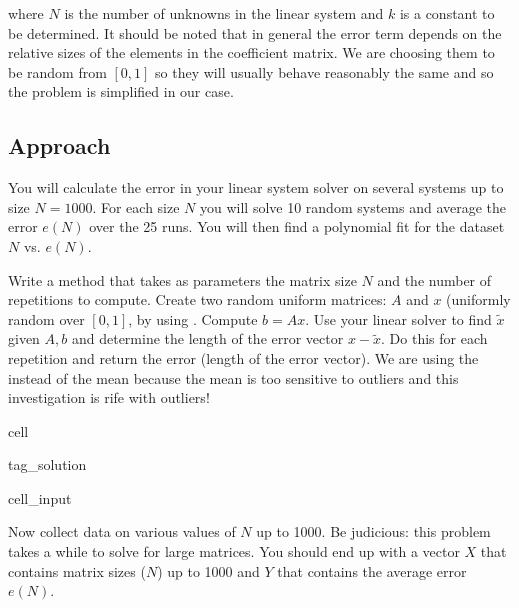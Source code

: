 \documentclass[letterpaper,10pt,english]{jupyterBook}
\begin{document}
\sphinxAtStartPar
where \(N\) is the number of unknowns in the linear system and \(k\) is a constant to be determined. It should be noted that in general the error term depends on the relative sizes of the elements in the coefficient matrix. We are choosing them to be random from \([0,1]\) so they will usually behave reasonably the same and so the problem is simplified in our case.


\subsection{Approach}
\label{\detokenize{lessons/Gaussian_Elimination-student:approach}}
\sphinxAtStartPar
You will calculate the error in your linear system solver on several systems up to size \(N=1000\). For each size \(N\) you will solve 10 random systems and average the error \(e(N)\) over the 25 runs. You will then find a polynomial fit for the dataset \(N\) vs. \(e(N)\).

\sphinxAtStartPar
Write a method that takes as parameters the matrix size \(N\) and the number of repetitions to compute. Create two random uniform matrices: \(A\) and \(x\) (uniformly random over \([0,1]\), by using . Compute \(b = Ax\). Use your linear solver to find \(\tilde{x}\) given \(A,b\) and determine the length of the error vector \(x - \tilde{x}\). Do this for each repetition and return the  error (length of the error vector). We are using the  instead of the mean because the mean is too sensitive to outliers and this investigation is rife with outliers!

\begin{sphinxuseclass}{cell}
\begin{sphinxuseclass}{tag_solution}\begin{sphinxVerbatimInput}

\begin{sphinxuseclass}{cell_input}
\begin{sphinxVerbatim}[commandchars=\\\{\}]
\end{sphinxVerbatim}

\end{sphinxuseclass}\end{sphinxVerbatimInput}

\end{sphinxuseclass}
\end{sphinxuseclass}
\sphinxAtStartPar
Now collect data on various values of \(N\) up to 1000. Be judicious: this problem takes a while to solve for large matrices. You should end up with a vector \(X\) that contains matrix sizes (\(N\)) up to 1000 and \(Y\) that contains the average error \(e(N)\).
\end{document}
